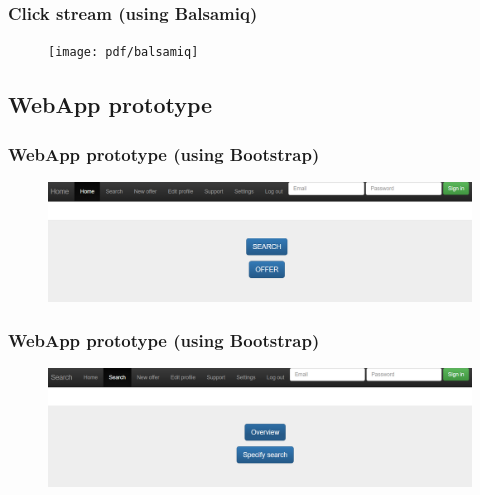 \documentclass{beamer}
\begin{document}

\begin{frame}
\frametitle{Click stream (using Balsamiq)}
\begin{figure}
\texttt{[image: pdf/balsamiq]}
\end{figure}
\end{frame}


\subsection{WebApp prototype} %


\begin{frame}
\frametitle{WebApp prototype (using Bootstrap)}
\begin{figure}
\includegraphics[width=\textwidth]{png/webapp-start.png}
\end{figure}
\end{frame}


\begin{frame}
\frametitle{WebApp prototype (using Bootstrap)}
\begin{figure}
\includegraphics[width=\textwidth]{png/webapp-search.png}
\end{figure}
\end{frame}

\end{document}
